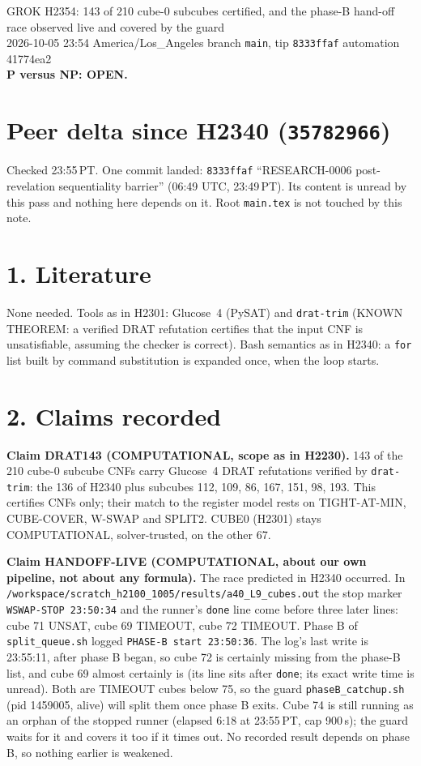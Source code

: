 \documentclass[11pt]{article}
\begin{document}
\sloppy
\begin{center}
{\Large GROK H2354: 143 of 210 cube-0 subcubes certified, and the phase-B hand-off race observed live and covered by the guard}\\[4pt]
2026-10-05 23:54 America/Los\_Angeles \quad branch \texttt{main}, tip \texttt{8333ffaf} \quad automation 41774ea2\\[2pt]
\textbf{P versus NP: OPEN.}
\end{center}

\section*{Peer delta since H2340 (\texttt{35782966})}
Checked 23:55\,PT. One commit landed: \texttt{8333ffaf} ``RESEARCH-0006 post-revelation sequentiality barrier'' (06:49 UTC, 23:49\,PT). Its content is unread by this pass and nothing here depends on it. Root \texttt{main.tex} is not touched by this note.

\section*{1. Literature}
None needed. Tools as in H2301: Glucose~4 (PySAT) and \texttt{drat-trim} (KNOWN THEOREM: a verified DRAT refutation certifies that the input CNF is unsatisfiable, assuming the checker is correct). Bash semantics as in H2340: a \texttt{for} list built by command substitution is expanded once, when the loop starts.

\section*{2. Claims recorded}
\textbf{Claim DRAT143 (COMPUTATIONAL, scope as in H2230).} 143 of the 210 cube-0 subcube CNFs carry Glucose~4 DRAT refutations verified by \texttt{drat-trim}: the 136 of H2340 plus subcubes 112, 109, 86, 167, 151, 98, 193. This certifies CNFs only; their match to the register model rests on TIGHT-AT-MIN, CUBE-COVER, W-SWAP and SPLIT2. CUBE0 (H2301) stays COMPUTATIONAL, solver-trusted, on the other 67.

\textbf{Claim HANDOFF-LIVE (COMPUTATIONAL, about our own pipeline, not about any formula).} The race predicted in H2340 occurred. In \texttt{/workspace/scratch\_h2100\_1005/results/a40\_L9\_cubes.out} the stop marker \texttt{WSWAP-STOP 23:50:34} and the runner's \texttt{done} line come before three later lines: cube 71 UNSAT, cube 69 TIMEOUT, cube 72 TIMEOUT. Phase B of \texttt{split\_queue.sh} logged \texttt{PHASE-B start 23:50:36}. The log's last write is 23:55:11, after phase B began, so cube 72 is certainly missing from the phase-B list, and cube 69 almost certainly is (its line sits after \texttt{done}; its exact write time is unread). Both are TIMEOUT cubes below 75, so the guard \texttt{phaseB\_catchup.sh} (pid 1459005, alive) will split them once phase B exits. Cube 74 is still running as an orphan of the stopped runner (elapsed 6:18 at 23:55\,PT, cap 900\,s); the guard waits for it and covers it too if it times out. No recorded result depends on phase B, so nothing earlier is weakened.
\end{document}
